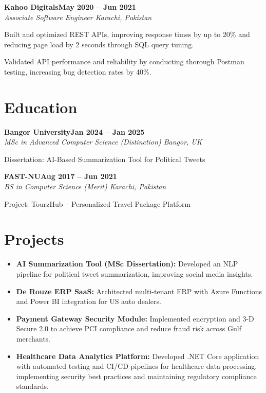 \documentclass[letterpaper,10pt]{article}
\newcommand{\headingBf}[2]{
  \hspace{10pt}\textbf{#1}\hfill\textbf{#2}\\
}
\newcommand{\headingIt}[2]{
  \hspace{10pt}\textit{#1}\hfill\textit{#2}\\
}
\newenvironment{resume_list}{
  \vspace{-7pt}
  \begin{itemize}[itemsep=-2px, parsep=1pt, leftmargin=30pt]
}{
  \end{itemize}
}
\begin{document}
\headingBf{Kahoo Digitals}{May 2020 -- Jun 2021}
\headingIt{Associate Software Engineer \hfill Karachi, Pakistan}{}
\begin{resume_list}
    \item Built and optimized REST APIs, improving response times by up to 20\% and reducing page load by 2 seconds through SQL query tuning.
    \item Validated API performance and reliability by conducting thorough Postman testing, increasing bug detection rates by 40\%.
\end{resume_list}

\section{Education}

\headingBf{Bangor University}{Jan 2024 -- Jan 2025}
\headingIt{MSc in Advanced Computer Science (Distinction) \hfill Bangor, UK}{}
\begin{resume_list}
    \item Dissertation: AI-Based Summarization Tool for Political Tweets
\end{resume_list}

\headingBf{FAST-NU}{Aug 2017 -- Jun 2021}
\headingIt{BS in Computer Science (Merit) \hfill Karachi, Pakistan}{}
\begin{resume_list}
    \item Project: TourzHub -- Personalized Travel Package Platform
\end{resume_list}

\section{Projects}
\begin{itemize}
    \setlength\itemsep{3pt}
    \item \textbf{AI Summarization Tool (MSc Dissertation):} Developed an NLP pipeline for political tweet summarization, improving social media insights.
    \item \textbf{De Rouze ERP SaaS:} Architected multi-tenant ERP with Azure Functions and Power BI integration for US auto dealers.
    \item \textbf{Payment Gateway Security Module:} Implemented encryption and 3-D Secure 2.0 to achieve PCI compliance and reduce fraud risk across Gulf merchants.
    \item \textbf{Healthcare Data Analytics Platform:} Developed .NET Core application with automated testing and CI/CD pipelines for healthcare data processing, implementing security best practices and maintaining regulatory compliance standards.
\end{itemize}
\end{document}
